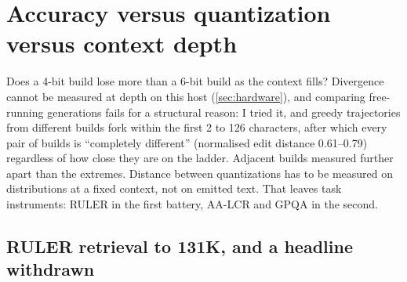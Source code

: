 \section{Accuracy versus quantization versus context depth}\label{sec:depth}

Does a 4-bit build lose more than a 6-bit build as the context fills? Divergence cannot be measured at
depth on this host (\cref{sec:hardware}), and comparing free-running generations fails for a structural
reason: I tried it, and greedy trajectories from different builds fork within the first 2 to 126
characters, after which every pair of builds is ``completely different'' (normalised edit distance
0.61--0.79) regardless of how close they are on the ladder. Adjacent builds measured further apart than
the extremes. Distance between quantizations has to be measured on distributions at a fixed context,
not on emitted text. That leaves task instruments: RULER in the first battery, AA-LCR and GPQA in the
second.

\subsection{RULER retrieval to 131K, and a headline withdrawn}\label{sec:ruler}

\begin{table}[t]
\centering\small
\caption{RULER, first battery: RULER's own generators and \texttt{string\_match\_all} metric, greedy,
no speculation, one split for both builds,  KV. The harness used the raw completion endpoint
with a \textbf{128-token output budget and reasoning left on}. ``Closed'' means the output contains
the end-of-reasoning tag. Prompts reached 98--100\,\% of the target length in every cell.}\label{tab:ruler}
\end{table}

